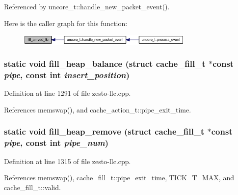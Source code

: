 Referenced by uncore\_\-t::handle\_\-new\_\-packet\_\-event().

Here is the caller graph for this function:\nopagebreak
\begin{figure}[H]
\begin{center}
\leavevmode
\includegraphics[width=245pt]{zesto-llc_8cpp_f1f903df28f067bfd63f3145c04a5870_icgraph}
\end{center}
\end{figure}
\subsubsection[{fill\_\-heap\_\-balance}]{\setlength{\rightskip}{0pt plus 5cm}static void fill\_\-heap\_\-balance (struct {\bf cache\_\-fill\_\-t} $\ast$const  {\em pipe}, \/  const int {\em insert\_\-position})\hspace{0.3cm}{\tt  [static]}}\label{zesto-llc_8cpp_45008d7fc6cedc3c5187a70e4cfc1d4a}




Definition at line 1291 of file zesto-llc.cpp.

References memswap(), and cache\_\-action\_\-t::pipe\_\-exit\_\-time.
\subsubsection[{fill\_\-heap\_\-remove}]{\setlength{\rightskip}{0pt plus 5cm}static void fill\_\-heap\_\-remove (struct {\bf cache\_\-fill\_\-t} $\ast$const  {\em pipe}, \/  const int {\em pipe\_\-num})\hspace{0.3cm}{\tt  [static]}}\label{zesto-llc_8cpp_9c8931eb6f26a4862221d39dd688368f}




Definition at line 1315 of file zesto-llc.cpp.

References memswap(), cache\_\-fill\_\-t::pipe\_\-exit\_\-time, TICK\_\-T\_\-MAX, and cache\_\-fill\_\-t::valid.
